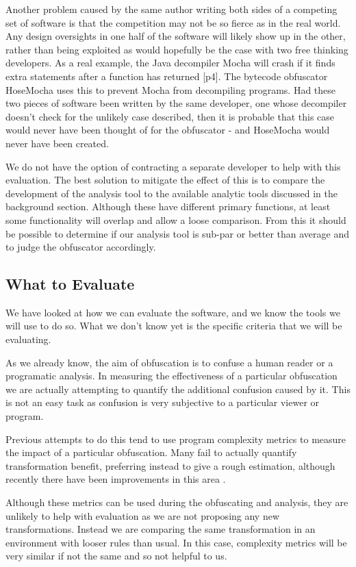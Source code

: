 \documentclass{report}
\begin{document}
Another problem caused by the same author writing both sides of a competing set of software is that the competition
may not be so fierce as in the real world. Any design oversights in one half of the software will likely show up
in the other, rather than being exploited as would hopefully be the case with two free thinking developers. As a real
example, the Java decompiler Mocha will crash if it finds extra statements after a function has returned
\cite{hosemocha}[p4]. The bytecode obfuscator HoseMocha uses this to prevent Mocha from decompiling programs. Had these two
pieces of software been written by the same developer, one whose decompiler doesn't check for the unlikely case described,
then it is probable that this case would never have been thought of for the obfuscator - and HoseMocha would never have
been created.

We do not have the option of contracting a separate developer to help with this evaluation. The best solution to mitigate the effect
of this is to compare the development of the analysis tool to the available analytic tools discussed in the background section. Although
these have different primary functions, at least some functionality will overlap and allow a loose comparison. From this it
should be possible to determine if our analysis tool is sub-par or better than average and to judge the obfuscator
accordingly.

\subsection{What to Evaluate}

We have looked at how we can evaluate the software, and we know the tools we will use to do so. What we don't know yet is
the specific criteria that we will be evaluating. 

As we already know, the aim of obfuscation is to confuse a human reader or a programatic analysis. In measuring the effectiveness
of a particular obfuscation we are actually attempting to quantify the additional confusion caused by it. This is not an easy task
as confusion is very subjective to a particular viewer or program.

Previous attempts to do this tend to use program complexity metrics to measure the impact of a particular obfuscation. Many fail to
actually quantify transformation benefit, preferring instead to give a rough estimation, although recently there have been improvements in
this area \cite{obfquant}.

Although these metrics can be used during the obfuscating and analysis, they are unlikely to help with evaluation as we are
not proposing any new transformations. Instead we are comparing the same transformation in an environment with looser rules than usual.
In this case, complexity metrics will be very similar if not the same and so not helpful to us.
\end{document}
